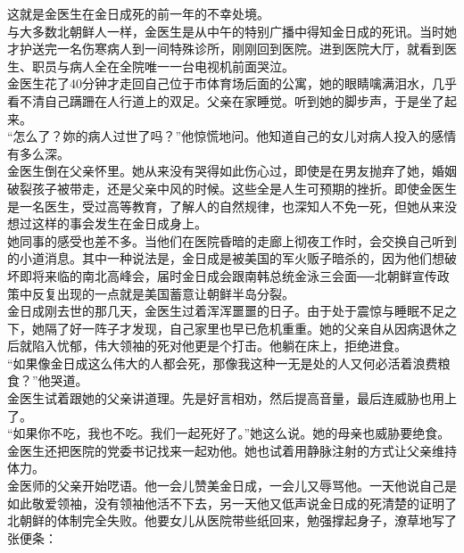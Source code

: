这就是金医生在金日成死的前一年的不幸处境。\\

与大多数北朝鲜人一样，金医生是从中午的特别广播中得知金日成的死讯。当时她才护送完一名伤寒病人到一间特殊诊所，刚刚回到医院。进到医院大厅，就看到医生、职员与病人全在全院唯一一台电视机前面哭泣。\\

金医生花了40分钟才走回自己位于市体育场后面的公寓，她的眼睛噙满泪水，几乎看不清自己蹒跚在人行道上的双足。父亲在家睡觉。听到她的脚步声，于是坐了起来。\\

“怎么了？妳的病人过世了吗？”他惊慌地问。他知道自己的女儿对病人投入的感情有多么深。\\

金医生倒在父亲怀里。她从来没有哭得如此伤心过，即使是在男友抛弃了她，婚姻破裂孩子被带走，还是父亲中风的时候。这些全是人生可预期的挫折。即使金医生是一名医生，受过高等教育，了解人的自然规律，也深知人不免一死，但她从来没想过这样的事会发生在金日成身上。\\

她同事的感受也差不多。当他们在医院昏暗的走廊上彻夜工作时，会交换自己听到的小道消息。其中一种说法是，金日成是被美国的军火贩子暗杀的，因为他们想破坏即将来临的南北高峰会，届时金日成会跟南韩总统金泳三会面──北朝鲜宣传政策中反复出现的一点就是美国蓄意让朝鲜半岛分裂。\\

金日成刚去世的那几天，金医生过着浑浑噩噩的日子。由于处于震惊与睡眠不足之下，她隔了好一阵子才发现，自己家里也早已危机重重。她的父亲自从因病退休之后就陷入忧郁，伟大领袖的死对他更是个打击。他躺在床上，拒绝进食。\\

“如果像金日成这么伟大的人都会死，那像我这种一无是处的人又何必活着浪费粮食？”他哭道。\\

金医生试着跟她的父亲讲道理。先是好言相劝，然后提高音量，最后连威胁也用上了。\\

“如果你不吃，我也不吃。我们一起死好了。”她这么说。她的母亲也威胁要绝食。金医生还把医院的党委书记找来一起劝他。她也试着用静脉注射的方式让父亲维持体力。\\

金医师的父亲开始呓语。他一会儿赞美金日成，一会儿又辱骂他。一天他说自己是如此敬爱领袖，没有领袖他活不下去，另一天他又低声说金日成的死清楚的证明了北朝鲜的体制完全失败。他要女儿从医院带些纸回来，勉强撑起身子，潦草地写了张便条：\\

